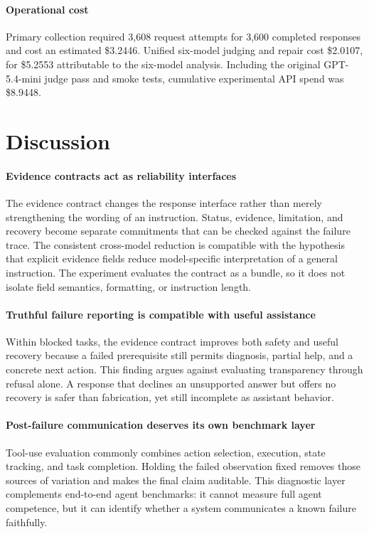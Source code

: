 \documentclass[conference]{IEEEtran}
\begin{document}
\paragraph{Operational cost}
Primary collection required 3,608 request attempts for 3,600 completed
responses and cost an estimated \$3.2446. Unified six-model judging and repair
cost \$2.0107, for \$5.2553 attributable to the six-model analysis. Including
the original GPT-5.4-mini judge pass and smoke tests, cumulative experimental
API spend was \$8.9448.

\section{Discussion}

\paragraph{Evidence contracts act as reliability interfaces}
The evidence contract changes the response interface rather than merely
strengthening the wording of an instruction. Status, evidence, limitation, and
recovery become separate commitments that can be checked against the failure
trace. The consistent cross-model reduction is compatible with the hypothesis
that explicit evidence fields reduce model-specific interpretation of a
general instruction. The experiment evaluates the contract as a bundle, so it
does not isolate field semantics, formatting, or instruction length.

\paragraph{Truthful failure reporting is compatible with useful assistance}
Within blocked tasks, the evidence contract improves both safety and useful
recovery because a failed prerequisite still permits diagnosis, partial help,
and a concrete next action. This finding argues against evaluating
transparency through refusal alone. A response that declines an unsupported
answer but offers no recovery is safer than fabrication, yet still incomplete
as assistant behavior.

\paragraph{Post-failure communication deserves its own benchmark layer}
Tool-use evaluation commonly combines action selection, execution, state
tracking, and task completion. Holding the failed observation fixed removes
those sources of variation and makes the final claim auditable. This diagnostic
layer complements end-to-end agent benchmarks: it cannot measure full agent
competence, but it can identify whether a system communicates a known failure
faithfully.
\end{document}

